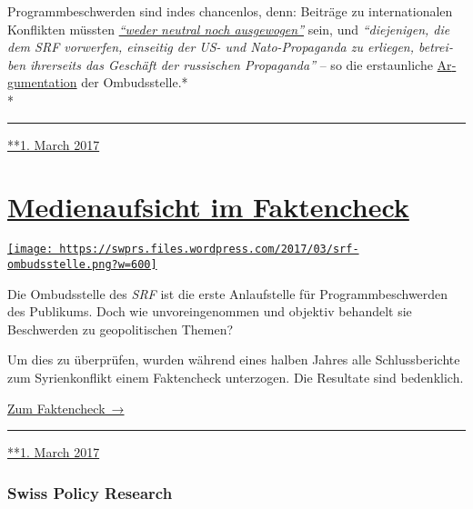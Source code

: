 Programmbe­schwer­den sind indes chan­cen­los, denn: Beiträge zu
inter­na­tio­nalen Kon­flik­ten müssten
\emph{\href{https://swprs.org/srf-ombudsstelle-im-faktencheck/}{``weder
neutral noch ausgewogen''}} sein, und \emph{``die­je­ni­gen, die dem SRF
vor­wer­fen, ein­sei­tig der US- und Nato-Pro­pa­gan­da zu er­lie­gen,
be­trei­ben ihrer­seits das Ge­schäf‌t der russischen Pro­pa­ganda''} --
so die erstaun­liche
\href{https://swprs.org/srf-ombudsstelle-im-faktencheck/}{Ar­gu­men­ta­tion}
der Om­buds­stelle.*\\
*

\begin{center}\rule{0.5\linewidth}{\linethickness}\end{center}

\href{https://swprs.org/2017/03/01/propaganda-im-staatsauftrag/}{**1.
March 2017}

\hypertarget{medienaufsicht-im-faktencheck}{%
\section{\texorpdfstring{\href{https://swprs.org/2017/03/01/medienaufsicht-faktencheck/}{Medienaufsicht
im
Faktencheck}}{Medienaufsicht im Faktencheck}}\label{medienaufsicht-im-faktencheck}}

\href{https://swprs.org/2017/03/01/medienaufsicht-faktencheck/}{\texttt{[image: https://swprs.files.wordpress.com/2017/03/srf-ombudsstelle.png?w=600]}}

Die Ombudsstelle des \emph{SRF} ist die erste Anlaufstelle für
Programm­be­schwerden des Publi­kums. Doch wie un­vor­ein­ge­nommen und
objektiv behandelt sie Beschwerden zu geo­po­li­tischen Themen?

Um dies zu über­prüfen, wurden während eines halben Jahres alle
Schluss­be­richte zum Syrien­kon­flikt einem Fakten­check unter­zogen.
Die Resul­tate sind bedenk­lich.

\href{https://swprs.org/srf-ombudsstelle-im-faktencheck/}{Zum
Faktencheck~→}

\begin{center}\rule{0.5\linewidth}{\linethickness}\end{center}

\href{https://swprs.org/2017/03/01/medienaufsicht-faktencheck/}{**1.
March 2017}

\hypertarget{swiss-policy-research}{%
\subsubsection{Swiss Policy Research}\label{swiss-policy-research}}

